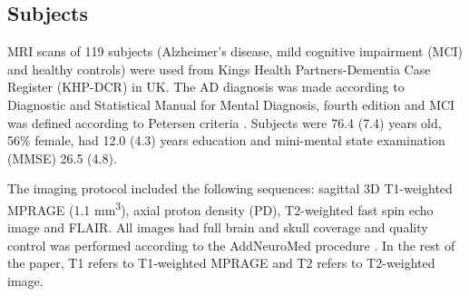 \subsection{Subjects} \label{subjects}
MRI scans of 119 subjects (Alzheimer’s disease, mild cognitive impairment (MCI) and healthy controls) were used from Kings Health Partners-Dementia Case Register (KHP-DCR) in UK. The AD diagnosis was made according to Diagnostic and Statistical Manual for Mental Diagnosis, fourth edition and MCI was defined according to Petersen criteria \cite{PetersonMCI}. Subjects were 76.4 (7.4) years old, 56\% female, had 12.0 (4.3) years education and mini-mental state examination (MMSE) 26.5 (4.8).
\par
The imaging protocol included the following sequences: sagittal 3D T1-weighted MPRAGE (1.1 mm\textsuperscript{3}), axial proton density (PD), T2-weighted fast spin echo image and FLAIR. All images had full brain and skull coverage and quality control was performed according to the AddNeuroMed procedure \cite{AddNeuroMed}. In the rest of the paper, T1 refers to T1-weighted MPRAGE and T2 refers to T2-weighted image.

  
  
  
  
  